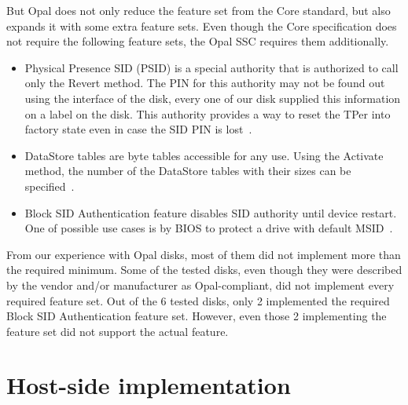 But Opal does not only reduce the feature set from the Core standard, but also expands it with some extra feature sets. Even though the Core specification does not require the following feature sets, the Opal SSC requires them additionally.
\begin{itemize}
\item Physical Presence SID (PSID) is a special authority that is authorized to call only the Revert method. The PIN for this authority may not be found out using the interface of the disk, every one of our disk supplied this information on a label on the disk. This authority provides a way to reset the TPer into factory state even in case the SID PIN is lost~\cite{tcg-psid}.
\item DataStore tables are byte tables accessible for any use. Using the Activate method, the number of the DataStore tables with their sizes can be specified~\cite{tcg-additional-datastore}.
\item Block SID Authentication feature disables SID authority until device restart. One of possible use cases is by BIOS to protect a drive with default MSID~\cite{tcg-block-sid-auth}.
\end{itemize}




From our experience with Opal disks, most of them did not implement more than the required minimum. Some of the tested disks, even though they were described by the vendor and/or manufacturer as Opal-compliant, did not implement every required feature set. Out of the 6 tested disks, only 2 implemented the required Block SID Authentication feature set. However, even those 2 implementing the feature set did not support the actual feature.




\section{Host-side implementation}

